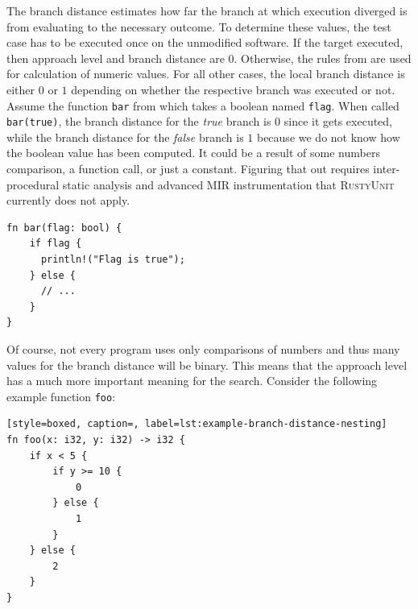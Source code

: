 \documentclass[paper=a4,%
  twoside,%
  BCOR4mm,%
  abstract=true,%
  toc=bibliography,%
  chapterprefix=true,%
  toc=bibliographynumbered,%
  open=right,%
  english,%
  pagesize=pdftex]{scrreprt}
\newcommand{\tech}{\textsc{RustyUnit}\xspace}
\newcommand{\mir}{\ac{MIR}\xspace}
\begin{document}
The branch distance estimates how far the branch at which execution diverged is from evaluating to the necessary outcome. To determine these values, the test case has to be executed once on the unmodified software. If the target executed, then approach level and branch distance are $0$. Otherwise, the rules from  are used for calculation of numeric values. For all other cases, the local branch distance is either $0$ or $1$ depending on whether the respective branch was executed or not. Assume the function \texttt{bar} from  which takes a boolean named \texttt{flag}. When called \texttt{bar(true)}, the branch distance for the \emph{true} branch is $0$ since it gets executed, while the branch distance for the \emph{false} branch is $1$ because we do not know how the boolean value has been computed. It could be a result of some numbers comparison, a function call, or just a constant. Figuring that out requires inter-procedural static analysis and advanced \mir instrumentation that \tech currently does not apply. 

\begin{lstlisting}[style=boxed, caption={Computation of local branch distance for a boolean flag that we do not know where it came from}, label=lst:example-branch-distance-boolean-flag]
fn bar(flag: bool) {
    if flag {
      println!("Flag is true"); 
    } else {
      // ...
    }
}
\end{lstlisting}

Of course, not every program uses only comparisons of numbers and thus many values for the branch distance will be binary. This means that the approach level has a much more important meaning for the search. Consider the following example function \texttt{foo}:

\begin{lstlisting}[style=boxed, caption=, label=lst:example-branch-distance-nesting]
fn foo(x: i32, y: i32) -> i32 {
    if x < 5 {
        if y >= 10 {
            0
        } else {
            1
        }
    } else {
        2
    }
}
\end{lstlisting}
\end{document}

